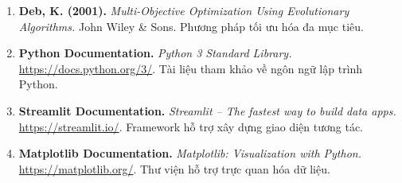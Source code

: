 \begin{enumerate}
    \item \textbf{Deb, K. (2001).} \textit{Multi-Objective Optimization Using Evolutionary Algorithms.} John Wiley \& Sons. Phương pháp tối ưu hóa đa mục tiêu.

    \item \textbf{Python Documentation.} \textit{Python 3 Standard Library.} \url{https://docs.python.org/3/}. Tài liệu tham khảo về ngôn ngữ lập trình Python.

    \item \textbf{Streamlit Documentation.} \textit{Streamlit -- The fastest way to build data apps.} \url{https://streamlit.io/}. Framework hỗ trợ xây dựng giao diện tương tác.

    \item \textbf{Matplotlib Documentation.} \textit{Matplotlib: Visualization with Python.} \url{https://matplotlib.org/}. Thư viện hỗ trợ trực quan hóa dữ liệu.
\end{enumerate}
